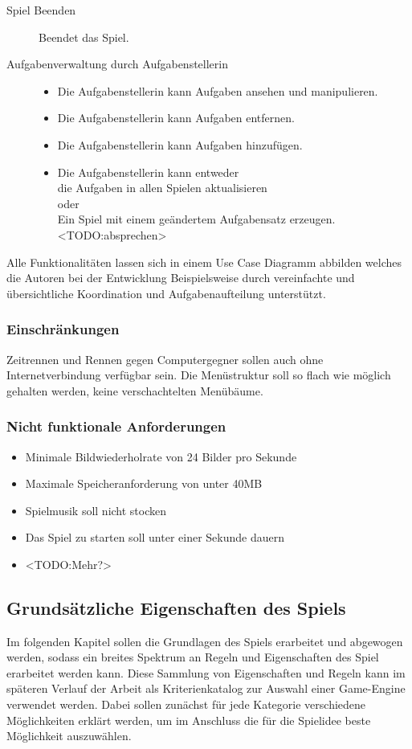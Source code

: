\begin{description}
		\item[Spiel Beenden]{ Beendet das Spiel. }
		\item[Aufgabenverwaltung durch Aufgabenstellerin]{
			\begin{itemize}
				\item{ Die Aufgabenstellerin kann Aufgaben ansehen und manipulieren. }
				\item{ Die Aufgabenstellerin kann Aufgaben entfernen. }
				\item{ Die Aufgabenstellerin kann Aufgaben hinzufügen. }
				\item{ Die Aufgabenstellerin kann entweder \\
					die Aufgaben in allen Spielen aktualisieren \\
					oder \\
					Ein Spiel mit einem geändertem Aufgabensatz erzeugen. <TODO:absprechen>
				}
			\end{itemize}
		}
	\end{description}
	Alle Funktionalitäten lassen sich in einem Use Case Diagramm abbilden welches die Autoren bei der Entwicklung Beispielsweise durch vereinfachte und übersichtliche Koordination und Aufgabenaufteilung unterstützt.
	\label{ssec:ucd}

	\subsubsection{Einschränkungen}
		Zeitrennen und Rennen gegen Computergegner sollen auch ohne Internetverbindung verfügbar sein.
		Die Menüstruktur soll so flach wie möglich gehalten werden, keine verschachtelten Menübäume.
	\subsubsection{Nicht funktionale Anforderungen}
		\begin{itemize}
			\item{ Minimale Bildwiederholrate von 24 Bilder pro Sekunde }
			\item{ Maximale Speicheranforderung von unter 40MB }
			\item{ Spielmusik soll nicht stocken }
			\item{ Das Spiel zu starten soll unter einer Sekunde dauern }
			\item{ <TODO:Mehr?> }
		\end{itemize}

\subsection{Grundsätzliche Eigenschaften des Spiels}
	Im folgenden Kapitel sollen die Grundlagen des Spiels erarbeitet und abgewogen werden, sodass ein breites Spektrum an Regeln und Eigenschaften des Spiel erarbeitet werden kann. Diese Sammlung von Eigenschaften und Regeln kann im späteren Verlauf der Arbeit als Kriterienkatalog zur Auswahl einer Game-Engine verwendet werden. Dabei sollen zunächst für jede Kategorie verschiedene Möglichkeiten erklärt werden, um im Anschluss die für die Spielidee beste Möglichkeit auszuwählen.

